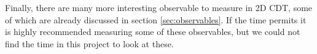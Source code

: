 Finally, there are many more interesting observable to measure in 2D CDT, some of which are already discussed in section \ref{sec:observables}.
If the time permits it is highly recommended measuring some of these observables, but we could not find the time in this project to look at these.